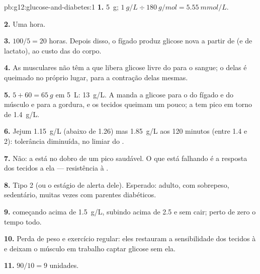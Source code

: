 \begin{solution}{pb:g12:glucose-and-diabetes:1}
\textbf{1.} \qty{5}{g}; $\qty{1}{g/L} \div \qty{180}{g/mol} = \qty{5.55}{mmol/L}$.

\textbf{2.} Uma hora.

\textbf{3.} $100/5 = 20$ horas. Depois disso, o fígado produz glicose
nova a partir de  (e de lactato), ao custo das  do corpo.

\textbf{4.} As  musculares não têm a  que libera glicose
livre do  para o sangue; o  delas é queimado no
próprio lugar, para a contração delas mesmas.

\textbf{5.} $5 + 60 = \qty{65}{g}$ em \qty{5}{L}: \qty{13}{g/L}. A
 manda a glicose para o  do fígado e do músculo e
para a gordura, e os tecidos queimam um pouco; a  tem pico em
torno de \qty{1.4}{g/L}.

\textbf{6.} Jejum \qty{1.15}{g/L} (abaixo de 1.26) mas \qty{1.85}{g/L}
aos 120 minutos (entre 1.4 e 2): tolerância diminuída, no limiar do
.

\textbf{7.} Não: a  está no dobro de um pico saudável. O que
está falhando é a resposta dos tecidos a ela --- resistência à .

\textbf{8.} Tipo 2 (ou o estágio de alerta dele). Esperado: adulto, com
sobrepeso, sedentário, muitas vezes com parentes diabéticos.

\textbf{9.}  começando acima de \qty{1.5}{g/L}, subindo acima
de \num{2.5} e sem cair;  perto de zero o tempo todo.

\textbf{10.} Perda de peso e exercício regular: eles restauram a
sensibilidade dos tecidos à  e deixam o músculo em trabalho
captar glicose sem ela.

\textbf{11.} $90/10 = 9$ unidades.


\end{solution}

